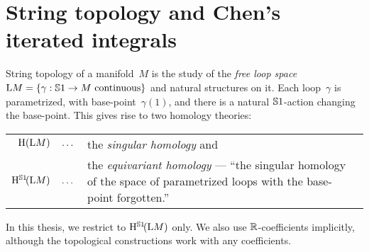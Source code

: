 \documentclass[\MainFolder/Text.tex]{subfiles}
\begin{document}
\section{String topology and Chen's iterated integrals}

String topology of a manifold~$M$ is the study of the \emph{free loop space} $\mathrm{L} M = \{\gamma: \mathbb{S}{1}\rightarrow M\text{ continuous}\}$ and natural structures on it. Each loop~$\gamma$ is parametrized, with base-point~$\gamma(1)$, and there is a natural $\mathbb{S}{1}$-action changing the base-point. This gives rise to two homology theories:
\begin{center}
\begin{tabular}{rl}
 $\mathrm{H}(\mathrm{L} M)\quad\dotsc$& the \emph{singular homology} and \\[1ex]
 $\mathrm{H}^{\mathbb{S}{1}}\!(\mathrm{L} M)\quad\dotsc$ & \parbox[t]{10cm}{the \emph{equivariant homology} --- ``the singular homology of the space of parametrized loops with the base-point forgotten.''}
\end{tabular}
\end{center}
In this thesis, we restrict to $\mathrm{H}^{\mathbb{S}{1}}\!(\mathrm{L} M)$ only. We also use $\mathbb{R}$-coefficients implicitly, although the topological constructions work with any coefficients.
\end{document}
